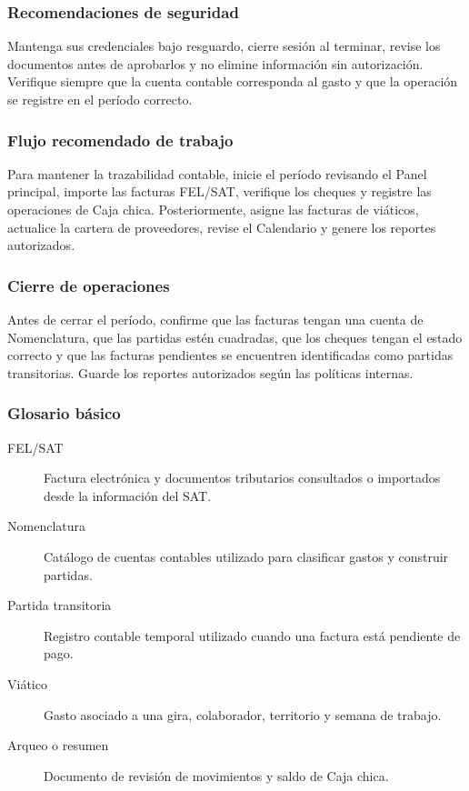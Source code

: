 \subsubsection{Recomendaciones de seguridad}
Mantenga sus credenciales bajo resguardo, cierre sesión al terminar, revise los documentos antes de aprobarlos y no elimine información sin autorización. Verifique siempre que la cuenta contable corresponda al gasto y que la operación se registre en el período correcto.

\subsubsection{Flujo recomendado de trabajo}
Para mantener la trazabilidad contable, inicie el período revisando el Panel principal, importe las facturas FEL/SAT, verifique los cheques y registre las operaciones de Caja chica. Posteriormente, asigne las facturas de viáticos, actualice la cartera de proveedores, revise el Calendario y genere los reportes autorizados.

\subsubsection{Cierre de operaciones}
Antes de cerrar el período, confirme que las facturas tengan una cuenta de Nomenclatura, que las partidas estén cuadradas, que los cheques tengan el estado correcto y que las facturas pendientes se encuentren identificadas como partidas transitorias. Guarde los reportes autorizados según las políticas internas.

\subsubsection{Glosario básico}
\begin{description}
\item[FEL/SAT] Factura electrónica y documentos tributarios consultados o importados desde la información del SAT.
\item[Nomenclatura] Catálogo de cuentas contables utilizado para clasificar gastos y construir partidas.
\item[Partida transitoria] Registro contable temporal utilizado cuando una factura está pendiente de pago.
\item[Viático] Gasto asociado a una gira, colaborador, territorio y semana de trabajo.
\item[Arqueo o resumen] Documento de revisión de movimientos y saldo de Caja chica.
\end{description}

